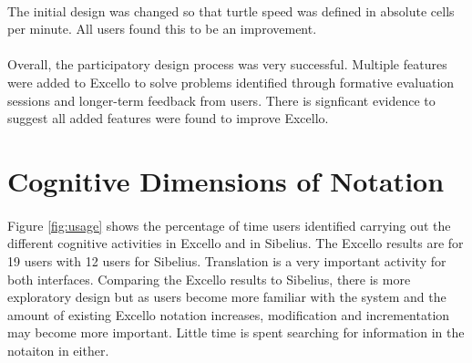 \paragraph{} The initial design was changed so that turtle speed was defined in absolute cells per minute. All users found this to be an improvement.

\paragraph{} Overall, the participatory design process was very successful. Multiple features were added to Excello to solve problems identified through formative evaluation sessions and longer-term feedback from users. There is signficant evidence to suggest all added features were found to improve Excello.

\section{Cognitive Dimensions of Notation}

\paragraph{} Figure \ref{fig:usage} shows the percentage of time users identified carrying out the different cognitive activities \cite{blackwell:tutorial} in Excello and in Sibelius. The Excello results are for 19 users with 12 users for Sibelius. Translation is a very important activity for both interfaces. Comparing the Excello results to Sibelius, there is more exploratory design but as users become more familiar with the system and the amount of existing Excello notation increases, modification and incrementation may become more important. Little time is spent searching for information in the notaiton in either.

